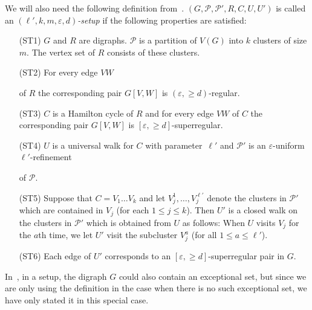 \documentclass{memo-l}
\def\COMMENT#1{}
\def\cP{\mathcal{P}}
\def\eps{\varepsilon}
\numberwithin{section}{chapter}
\numberwithin{equation}{section}
\numberwithin{firstthm}{section}
\numberwithin{figure}{section}
\begin{document}
We will also need the following definition from~\cite{Kelly}.
$(G,\cP,\cP',R,C,U,U')$ is called an \emph{$(\ell',k,m,\eps,d)$-setup} if the following properties are satisfied:
\begin{itemize}
\item [(ST1)] $G$ and $R$ are digraphs. $\mathcal{P}$ is a partition of $V(G)$ into
$k$ clusters of size $m$. The vertex set of $R$ consists of these clusters.
\item[(ST2)] For every edge $VW$%
\COMMENT{NOTE: I have changed each $U$ to a $V$ in (ST2) and (ST3). Otherwise, confusing with
$U$ being a universal walk in (ST4).}
of $R$ the corresponding pair $G[V,W]$ is $(\eps,\ge d)$-regular.
\item[(ST3)] $C$ is a Hamilton cycle of $R$ and for every edge $VW$ of $C$ the corresponding pair $G[V,W]$ is $[\eps,\ge d]$-superregular.
\item[(ST4)] $U$ is a universal walk for $C$ with parameter~$\ell'$ and $\cP'$ is an $\eps$-uniform $\ell'$-refinement%
   \COMMENT{need $\eps$-uniformity here in order to be able to derive (ST6) from (Sch3') in the proof of Lemma~\ref{lem:setup}.}
of $\cP$.
\item[(ST5)] Suppose that $C=V_1\dots V_{k}$ and let $V_j^1,\dots,V_j^{\ell'}$ denote the clusters in $\cP'$ which are contained
in $V_j$ (for each $1\le j\le k$). Then $U'$ is a closed walk on the clusters in $\cP'$ which is obtained from $U$ as follows:
When $U$ visits $V_j$ for the $a$th time, we let $U'$ visit the subcluster $V_j^a$ (for all $1\le a\le \ell'$).
\item[(ST6)] Each edge of $U'$ corresponds to an $[\eps,\ge d]$-superregular pair in $G$.
\end{itemize}
In~\cite{Kelly}, in a setup, the digraph $G$ could also contain an exceptional set, but since we are only using the definition
in the case when there is no such exceptional set, we have only stated it in this special case.
\end{document}
